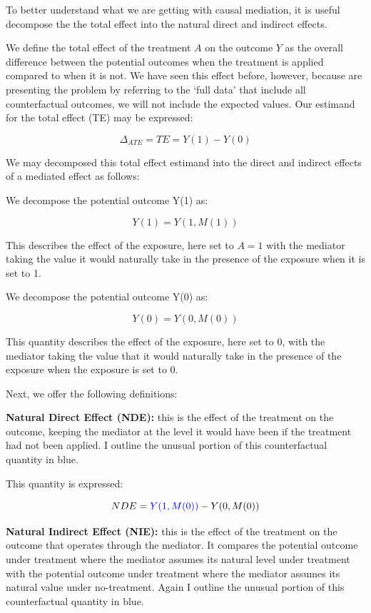 \documentclass[
  singlecolumn,
  9pt]{article}
\begin{document}
To better understand what we are getting with causal mediation, it is
useful decompose the the total effect into the natural direct and
indirect effects.

We define the total effect of the treatment \(A\) on the outcome \(Y\)
as the overall difference between the potential outcomes when the
treatment is applied compared to when it is not. We have seen this
effect before, however, because are presenting the problem by referring
to the `full data' that include all counterfactual outcomes, we will not
include the expected values. Our estimand for the total effect (TE) may
be expressed:

\[
\Delta_{ATE} = TE = Y(1) - Y(0)
\]

We may decomposed this total effect estimand into the direct and
indirect effects of a mediated effect as follows:

We decompose the potential outcome Y(1) as:

\[ 
Y(1) = Y(1, M(1))
\]

This describes the effect of the exposure, here set to \(A = 1\) with
the mediator taking the value it would naturally take in the presence of
the exposure when it is set to 1.

We decompose the potential outcome Y(0) as:

\[ 
Y(0) = Y(0, M(0))
\]

This quantity describes the effect of the exposure, here set to 0, with
the mediator taking the value that it would naturally take in the
presence of the exposure when the exposure is set to 0.

Next, we offer the following definitions:

\textbf{Natural Direct Effect (NDE):} this is the effect of the
treatment on the outcome, keeping the mediator at the level it would
have been if the treatment had not been applied. I outline the unusual
portion of this counterfactual quantity in blue.

This quantity is expressed:

\[
 NDE = \textcolor{blue}{Y(1, M(0))} - Y(0, M(0))
 \]

\textbf{Natural Indirect Effect (NIE):} this is the effect of the
treatment on the outcome that operates through the mediator. It compares
the potential outcome under treatment where the mediator assumes its
natural level under treatment with the potential outcome under treatment
where the mediator assumes its natural value under no-treatment. Again I
outline the unusual portion of this counterfactual quantity in blue.
\end{document}
